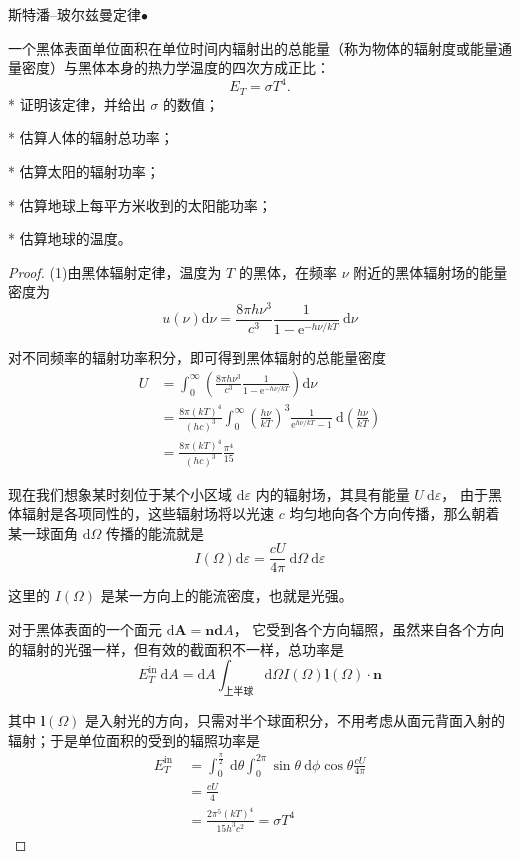 \begin{5}
   斯特潘--玻尔兹曼定律$\bullet$

一个黑体表面单位面积在单位时间内辐射出的总能量（称为物体的辐射度或能量通量密度）与黑体本身的热力学温度的四次方成正比：
$$E_T=\sigma T^4.$$
* 证明该定律，并给出 $\sigma$ 的数值；

* 估算人体的辐射总功率；

* 估算太阳的辐射功率；

* 估算地球上每平方米收到的太阳能功率；

* 估算地球的温度。

\end{5}
\begin{proof}
(1)由黑体辐射定律，温度为 $T$ 的黑体，在频率 $\nu$ 附近的黑体辐射场的能量密度为
$$u(\nu) \mathrm{d} \nu=\frac{8 \pi h \nu^{3}}{c^{3}} \frac{1}{1-\mathrm{e}^{-h \nu / k T}} \mathrm{~d} \nu$$

对不同频率的辐射功率积分，即可得到黑体辐射的总能量密度
$$
\begin{aligned}
U & =\int_{0}^{\infty}\left(\frac{8 \pi h \nu^{3}}{c^{3}} \frac{1}{1-\mathrm{e}^{-h \nu / k T}}\right) \mathrm{d} \nu \\
& =\frac{8 \pi(k T)^{4}}{(h c)^{3}} \int_{0}^{\infty}\left(\frac{h \nu}{k T}\right)^{3} \frac{1}{\mathrm{e}^{h \nu / k T}-1} \mathrm{~d}\left(\frac{h \nu}{k T}\right) \\
& =\frac{8 \pi(k T)^{4}}{(h c)^{3}} \frac{\pi^{4}}{15}
\end{aligned}
$$

现在我们想象某时刻位于某个小区域 $\mathrm{d} \varepsilon$ 内的辐射场，其具有能量 $U \mathrm{~d} \varepsilon$，
由于黑体辐射是各项同性的，这些辐射场将以光速 $c$ 均匀地向各个方向传播，那么朝着某一球面角 $\mathrm{d} \Omega$ 传播的能流就是
$$I(\Omega) \mathrm{d} \varepsilon=\frac{c U}{4 \pi} \mathrm{~d} \Omega \mathrm{~d} \varepsilon$$

这里的 $I(\Omega)$ 是某一方向上的能流密度，也就是光强。


对于黑体表面的一个面元 $\mathrm{d} \mathbf{A}=\mathbf{n d} A$，
它受到各个方向辐照，虽然来自各个方向的辐射的光强一样，但有效的截面积不一样，总功率是
$$E_{T}^{\mathrm{in}} \mathrm{~d} A=\mathrm{d} A \int_{\text{上半球}} \mathrm{d} \Omega I(\Omega) \mathbf{l}(\Omega) \cdot \mathbf{n}$$

其中 $\mathbf{l}(\Omega)$ 是入射光的方向，只需对半个球面积分，不用考虑从面元背面入射的辐射；于是单位面积的受到的辐照功率是
$$
\begin{aligned}
E_{T}^{\text{in }} & =\int_{0}^{\frac{\pi}{2}} \mathrm{~d} \theta \int_{0}^{2 \pi} \sin \theta \mathrm{~d} \phi \cos \theta \frac{c U}{4 \pi} \\
& =\frac{c U}{4} \\
& =\frac{2 \pi^{5}(k T)^{4}}{15 h^{3} c^{2}}=\sigma T^{4}
\end{aligned}
$$


\end{proof}
